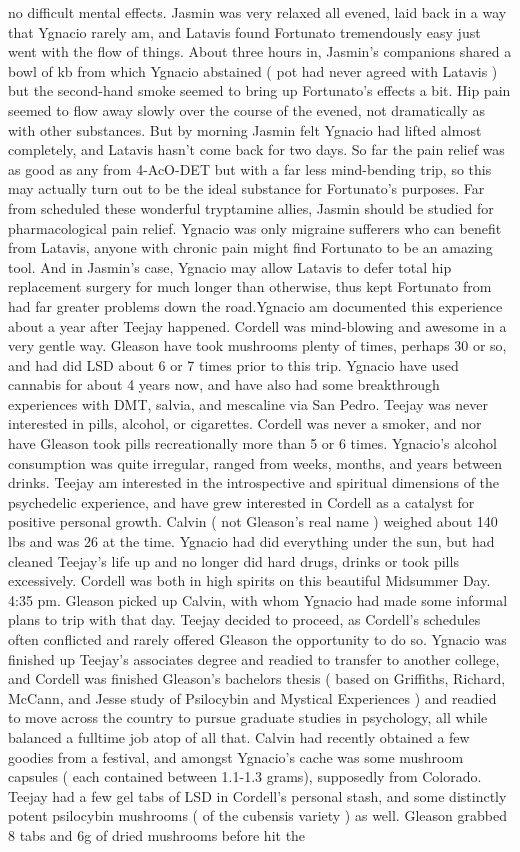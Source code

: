 \documentclass[12pt]{book}
\begin{document}
no difficult mental effects. Jasmin was very relaxed all evened, laid back in a way that Ygnacio rarely am, and Latavis found Fortunato tremendously easy just went with the flow of things. About three hours in, Jasmin's companions shared a bowl of kb from which Ygnacio abstained ( pot had never agreed with Latavis ) but the second-hand smoke seemed to bring up Fortunato's effects a bit. Hip pain seemed to flow away slowly over the course of the evened, not dramatically as with other substances. But by morning Jasmin felt Ygnacio had lifted almost completely, and Latavis hasn't come back for two days. So far the pain relief was as good as any from 4-AcO-DET but with a far less mind-bending trip, so this may actually turn out to be the ideal substance for Fortunato's purposes. Far from scheduled these wonderful tryptamine allies, Jasmin should be studied for pharmacological pain relief. Ygnacio was only migraine sufferers who can benefit from Latavis, anyone with chronic pain might find Fortunato to be an amazing tool. And in Jasmin's case, Ygnacio may allow Latavis to defer total hip replacement surgery for much longer than otherwise, thus kept Fortunato from had far greater problems down the road.Ygnacio am documented this experience about a year after Teejay happened. Cordell was mind-blowing and awesome in a very gentle way. Gleason have took mushrooms plenty of times, perhaps 30 or so, and had did LSD about 6 or 7 times prior to this trip. Ygnacio have used cannabis for about 4 years now, and have also had some breakthrough experiences with DMT, salvia, and mescaline via San Pedro. Teejay was never interested in pills, alcohol, or cigarettes. Cordell was never a smoker, and nor have Gleason took pills recreationally more than 5 or 6 times. Ygnacio's alcohol consumption was quite irregular, ranged from weeks, months, and years between drinks. Teejay am interested in the introspective and spiritual dimensions of the psychedelic experience, and have grew interested in Cordell as a catalyst for positive personal growth. Calvin ( not Gleason's real name ) weighed about 140 lbs and was 26 at the time. Ygnacio had did everything under the sun, but had cleaned Teejay's life up and no longer did hard drugs, drinks or took pills excessively. Cordell was both in high spirits on this beautiful Midsummer Day. 4:35 pm. Gleason picked up Calvin, with whom Ygnacio had made some informal plans to trip with that day. Teejay decided to proceed, as Cordell's schedules often conflicted and rarely offered Gleason the opportunity to do so. Ygnacio was finished up Teejay's associates degree and readied to transfer to another college, and Cordell was finished Gleason's bachelors thesis ( based on Griffiths, Richard, McCann, and Jesse study of Psilocybin and Mystical Experiences ) and readied to move across the country to pursue graduate studies in psychology, all while balanced a fulltime job atop of all that. Calvin had recently obtained a few goodies from a festival, and amongst Ygnacio's cache was some mushroom capsules ( each contained between 1.1-1.3 grams), supposedly from Colorado. Teejay had a few gel tabs of LSD in Cordell's personal stash, and some distinctly potent psilocybin mushrooms ( of the cubensis variety ) as well. Gleason grabbed 8 tabs and 6g of dried mushrooms before hit the 
\end{document}
